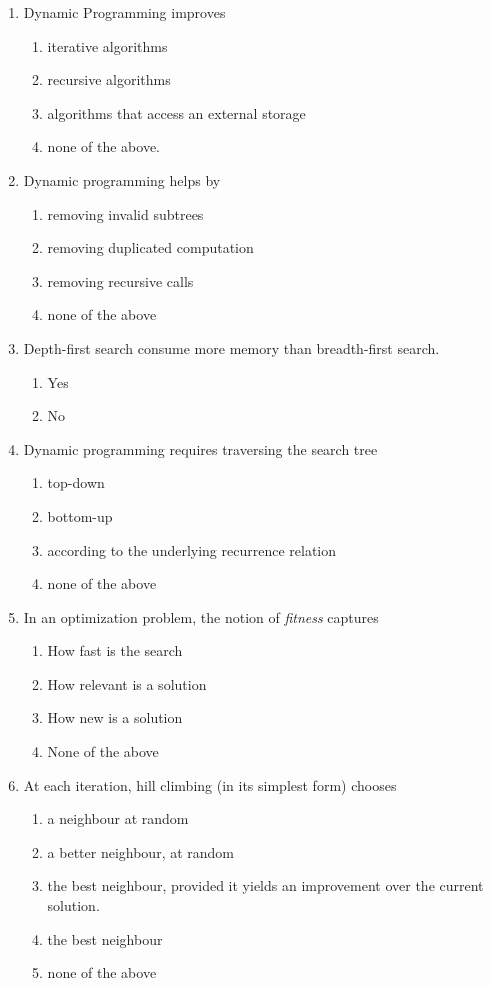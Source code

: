 \documentclass[11pt]{article}
\begin{document}
\begin{enumerate}
\item Dynamic Programming improves
\begin{enumerate}
\item iterative algorithms
\item recursive algorithms
\item algorithms that access an external storage
\item none of the above.
\end{enumerate}

\item Dynamic programming helps by
\begin{enumerate}
\item removing invalid subtrees
\item removing duplicated computation
\item removing recursive calls
\item none of the above
\end{enumerate}

\item Depth-first search consume more memory than breadth-first search.
\begin{enumerate}
\item Yes
\item No
\end{enumerate}

\item Dynamic programming requires traversing the search tree
\begin{enumerate}
\item top-down
\item bottom-up
\item according to the underlying recurrence relation
\item none of the above
\end{enumerate}

\item In an optimization problem, the notion of \emph{fitness} captures
\begin{enumerate}
\item How fast is the search
\item How relevant is a solution
\item How new is a solution
\item None of the above
\end{enumerate}

\item At each iteration, hill climbing (in its simplest form) chooses
\begin{enumerate}
\item a neighbour at random
\item a better neighbour, at random
\item the best neighbour, provided it yields an improvement over the
current solution.
\item the best neighbour
\item none of the above
\end{enumerate}
\end{enumerate}
\end{document}
